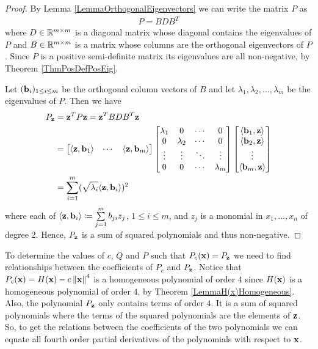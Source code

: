 \documentclass[a4paper,12pt,twoside,BCOR=10mm]{scrbook}
\begin{document}
\begin{proof}
By Lemma \ref{LemmaOrthogonalEigenvectors} we can write the matrix $P$ as
\begin{align}
    P = BDB^T
\end{align}
where $D \in \mathbb{R}^{m \times m}$ is a diagonal matrix whose diagonal contains the eigenvalues of $P$ and $B \in \mathbb{R}^{m \times m}$ is a matrix whose columns are the orthogonal eigenvectors of $P$. Since $P$ is a positive semi-definite matrix its eigenvalues are all non-negative, by Theorem \ref{ThmPosDefPosEig}.

Let $(\mathbf{b}_i)_{1\leq i \leq m}$ be the orthogonal column vectors of $B$
and let $\lambda_1, \lambda_2, \ldots, \lambda_m$ be the eigenvalues of $P$. Then we have
\begin{align*}
    P_{\mathbf{z}} &= \mathbf{z}^T P \mathbf{z} = \mathbf{z}^T B D B^T \mathbf{z}\\
    &= \begin{bmatrix}
    \langle \mathbf{z}, \mathbf{b}_1 \rangle & \cdots & \langle \mathbf{z}, \mathbf{b}_m \rangle
    \end{bmatrix}
    \begin{bmatrix}
    \lambda_1 & 0 & \cdots & 0\\
    0 & \lambda_2 & \cdots & 0\\
    \vdots & \vdots & \ddots & \vdots\\
    0 & 0 & \cdots & \lambda_m
    \end{bmatrix}
    \begin{bmatrix}
    \langle \mathbf{b}_1, \mathbf{z} \rangle\\
    \langle \mathbf{b}_2, \mathbf{z} \rangle\\
    \vdots\\
    \langle \mathbf{b}_m, \mathbf{z} \rangle
    \end{bmatrix}\\
    &= \sum_{i = 1}^m (\sqrt{\lambda_i}\langle \mathbf{z}, \mathbf{b}_i \rangle)^2
\end{align*}
where each of $\langle \mathbf{z}, \mathbf{b}_i \rangle \coloneqq \sum\limits_{j = 1}^m b_{ji}z_j$, $1 \leq i \leq m$, and $z_j$ is a monomial in $x_1, \ldots, x_n$ of degree 2. Hence, $P_{\mathbf{z}}$ is a sum of squared polynomials and thus non-negative.
\end{proof}

To determine the values of $c$, $Q$ and $P$ such that $P_c(\mathbf{x}) = P_{\mathbf{z}}$ we need to find relationships between the coefficients of $P_c$ and $P_{\mathbf{z}}$. Notice that $P_c(\mathbf{x}) = H(\mathbf{x}) - c\left\lVert\mathbf{x}\right\rVert^4$ is a homogeneous polynomial of order $4$ since $H(\mathbf{x})$ is a homogeneous polynomial of order $4$, by Theorem \ref{LemmaH(x)Homogeneous}. Also, the polynomial $P_{\mathbf{z}}$ only contains terms of order $4$. It is a sum of squared polynomials where the terms of the squared polynomials are the elements of $\mathbf{z}$. So, to get the relations between the coefficients of the two polynomials we can equate all fourth order partial derivatives of the polynomials with respect to $\mathbf{x}$.
\end{document}
